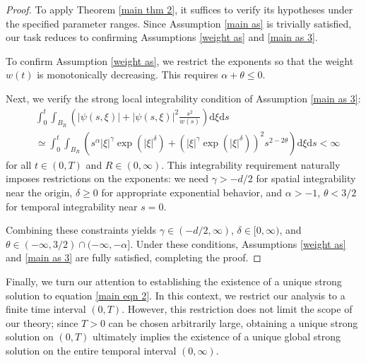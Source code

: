 \documentclass[11pt,reqno]{amsart}
\theoremstyle{definition}
\theoremstyle{remark}
\numberwithin{equation}{section}
\begin{document}
\begin{proof}
To apply Theorem \ref{main thm 2}, it suffices to verify its hypotheses under the specified parameter ranges. 
Since Assumption \ref{main as} is trivially satisfied, our task reduces to confirming Assumptions \ref{weight as} and \ref{main as 3}.

To confirm Assumption \ref{weight as}, we restrict the exponents so that the weight $w(t)$ is monotonically decreasing. 
This requires $\alpha + \theta \leq 0$. 

Next, we verify the strong local integrability condition of Assumption \ref{main as 3}:
\begin{align*}
&\int_0^t \int_{B_R} \left(|\psi(s,\xi)|+|\psi(s,\xi)|^2 \frac{s^2}{w(s)} \right)\mathrm{d}\xi \mathrm{d}s \\
&\simeq\int_0^t \int_{B_R} \left(s^\alpha  |\xi|^{\gamma} \exp\left( |\xi|^{\delta} \right)+ \left( |\xi|^{\gamma} \exp\left( |\xi|^{\delta} \right) \right)^2 s^{2-2\theta} \right)\mathrm{d}\xi \mathrm{d}s < \infty 
\end{align*}
for all $t \in (0,T)$ and $R \in (0,\infty)$. This integrability requirement naturally imposes restrictions on the exponents: we need $\gamma > -d/2$ for spatial integrability near the origin, $\delta \geq 0$ for appropriate exponential behavior, and $\alpha > -1$, $\theta < 3/2$ for temporal integrability near $s=0$. 

Combining these constraints yields $\gamma \in (-d/2,\infty)$, $\delta \in [0,\infty)$, and 
$\theta \in (-\infty, 3/2) \cap (-\infty,-\alpha]$. Under these conditions, Assumptions \ref{weight as} and \ref{main as 3} are fully satisfied, completing the proof.
\end{proof}


Finally, we turn our attention to establishing the existence of a unique strong solution to equation \eqref{main eqn 2}. 
In this context, we restrict our analysis to a finite time interval $(0,T)$. 
However, this restriction does not limit the scope of our theory; since $T>0$ can be chosen arbitrarily large, obtaining a unique strong solution on $(0,T)$ ultimately implies the existence of a unique global strong solution on the entire temporal interval $(0,\infty)$.
\end{document}
